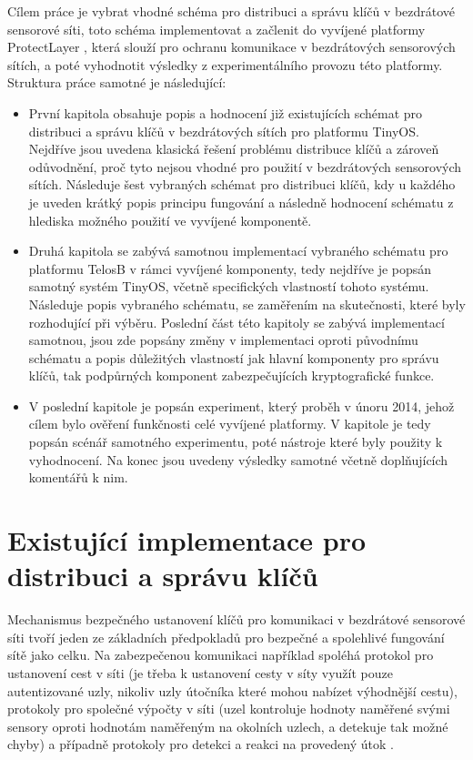 \documentclass[11pt,final,twoside]{fithesis2}
\begin{document}
Cílem práce je vybrat vhodné schéma pro distribuci a správu klíčů v bezdrátové sensorové síti, toto schéma implementovat a začlenit do vyvíjené platformy ProtectLayer \cite{Svenda2014a}, která slouží pro 
ochranu komunikace v bezdrátových sensorových sítích, a poté vyhodnotit výsledky z experimentálního provozu této platformy. Struktura práce samotné je následující:

\begin {itemize}
\item První kapitola obsahuje popis a hodnocení již existujících schémat pro distribuci a správu klíčů v bezdrátových sítích pro platformu TinyOS. Nejdříve jsou uvedena klasická řešení problému distribuce 
klíčů a zároveň odůvodnění, proč tyto nejsou vhodné pro použití v bezdrátových sensorových sítích. Následuje šest vybraných schémat pro distribuci klíčů, kdy u každého je uveden krátký popis principu 
fungování a následně hodnocení schématu z hlediska možného použití ve vyvíjené komponentě. 

\item Druhá kapitola se zabývá samotnou implementací vybraného schématu pro platformu TelosB v rámci vyvíjené komponenty, tedy nejdříve je popsán samotný systém TinyOS, včetně specifických vlastností tohoto 
systému. Následuje popis vybraného schématu, se zaměřením na skutečnosti, které byly rozhodující při výběru. Poslední část této kapitoly se zabývá implementací samotnou, jsou zde popsány změny v implementaci 
oproti původnímu schématu a popis důležitých vlastností jak hlavní komponenty pro správu klíčů, tak podpůrných komponent zabezpečujících kryptografické funkce. 

\item V poslední kapitole je popsán experiment, který proběh v únoru 2014, jehož cílem bylo ověření funkčnosti celé vyvíjené platformy. V kapitole je tedy popsán scénář samotného experimentu, poté nástroje 
které byly použity k vyhodnocení. Na konec jsou uvedeny výsledky samotné včetně doplňujících komentářů k nim. 
\end{itemize}



\chapter{Existující implementace pro distribuci a správu klíčů}
Mechanismus bezpečného ustanovení klíčů pro komunikaci v bezdrátové sensorové síti tvoří jeden ze základních předpokladů 
pro bezpečné a spolehlivé fungování sítě jako celku. Na zabezpečenou komunikaci například spoléhá protokol pro ustanovení cest v síti (je třeba k ustanovení cesty v síty využít
pouze autentizované uzly, nikoliv uzly útočníka které mohou nabízet výhodnější cestu), protokoly pro společné výpočty v síti (uzel kontroluje hodnoty naměřené svými sensory oproti
hodnotám naměřeným na okolních uzlech, a detekuje tak možné chyby) a případně protokoly pro detekci a reakci na provedený útok \cite{Alcaraz2012}.
\end{document}
